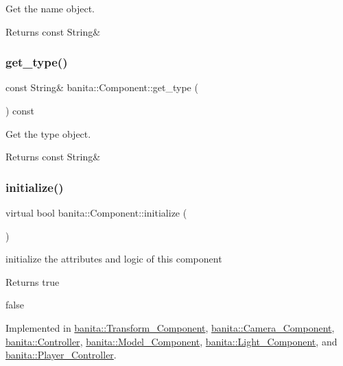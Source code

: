 Get the name object. 

\begin{DoxyReturn}{Returns}
const String\& 
\end{DoxyReturn}
\mbox{\label{classbanita_1_1_component_a69929c9ea05264cc3625c9475de6489d}} 
\subsubsection{\texorpdfstring{get\_type()}{get\_type()}}
{\footnotesize\ttfamily const String\& banita\+::\+Component\+::get\+\_\+type (\begin{DoxyParamCaption}{ }\end{DoxyParamCaption}) const\hspace{0.3cm}{\ttfamily [inline]}}



Get the type object. 

\begin{DoxyReturn}{Returns}
const String\& 
\end{DoxyReturn}
\mbox{\label{classbanita_1_1_component_a2f700c071185f7033caa69576dafa9e7}} 
\subsubsection{\texorpdfstring{initialize()}{initialize()}}
{\footnotesize\ttfamily virtual bool banita\+::\+Component\+::initialize (\begin{DoxyParamCaption}{ }\end{DoxyParamCaption})\hspace{0.3cm}{\ttfamily [pure virtual]}}



initialize the attributes and logic of this component 

\begin{DoxyReturn}{Returns}
true 

false 
\end{DoxyReturn}


Implemented in \mbox{\hyperlink{classbanita_1_1_transform___component_af21e03166cba2a8489b2a5e02867ce6a}{banita\+::\+Transform\+\_\+\+Component}}, \mbox{\hyperlink{classbanita_1_1_camera___component_a5cf5d281063a61d5c11914d30c512f40}{banita\+::\+Camera\+\_\+\+Component}}, \mbox{\hyperlink{classbanita_1_1_controller_a3a3bc92a032f22f0cd20cbff0f89d175}{banita\+::\+Controller}}, \mbox{\hyperlink{classbanita_1_1_model___component_af87c47483437405822718949a448bc14}{banita\+::\+Model\+\_\+\+Component}}, \mbox{\hyperlink{classbanita_1_1_light___component_a2afec04726df91aee59837fa1481d361}{banita\+::\+Light\+\_\+\+Component}}, and \mbox{\hyperlink{classbanita_1_1_player___controller_a42c2960117c977daf72083452fb69e86}{banita\+::\+Player\+\_\+\+Controller}}.

